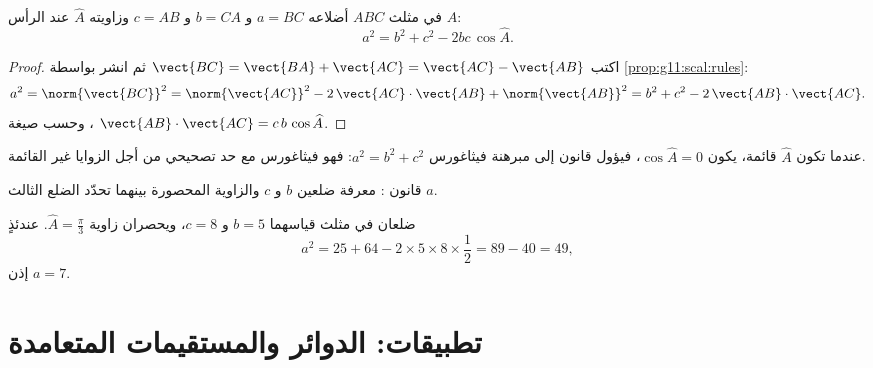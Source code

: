 \begin{theorem}\label{thm:g11:scal:cosines}
في مثلث $ABC$ أضلاعه $a = BC$ و $b = CA$ و $c = AB$ وزاويته
$\widehat A$ عند الرأس $A$:
\[
a^2 = b^2 + c^2 - 2bc\,\cos\widehat A .
\]
\end{theorem}

\begin{proof}
اكتب $\vect{BC} = \vect{BA} + \vect{AC} = \vect{AC} - \vect{AB}$ ثم انشر
بواسطة \cref{prop:g11:scal:rules}:
\[
a^2 = \norm{\vect{BC}}^2
= \norm{\vect{AC}}^2 - 2\,\vect{AC}\cdot\vect{AB} + \norm{\vect{AB}}^2
= b^2 + c^2 - 2\,\vect{AB}\cdot\vect{AC}.
\]
وحسب صيغة ،
$\vect{AB}\cdot\vect{AC} = c\,b\,\cos\widehat A$.
\end{proof}

\begin{remark}
عندما تكون $\widehat A$ قائمة، يكون $\cos\widehat A = 0$، فيؤول قانون
 إلى مبرهنة فيثاغورس $a^2 = b^2 + c^2$: فهو
فيثاغورس مع حد تصحيحي من أجل الزوايا غير القائمة.
\end{remark}

\begin{omfigure}

{\small قانون : معرفة ضلعين $b$ و $c$ والزاوية
المحصورة بينهما تحدّد الضلع الثالث $a$.}
\end{omfigure}

\begin{example}\label{ex:g11:scal:cosines}
ضلعان في مثلث قياسهما $b = 5$ و $c = 8$، ويحصران زاوية
$\widehat A = \frac\pi3$. عندئذٍ
\[
a^2 = 25 + 64 - 2 \times 5 \times 8 \times \frac12 = 89 - 40 = 49,
\]
إذن $a = 7$.
\end{example}

\section{تطبيقات: الدوائر والمستقيمات المتعامدة}

